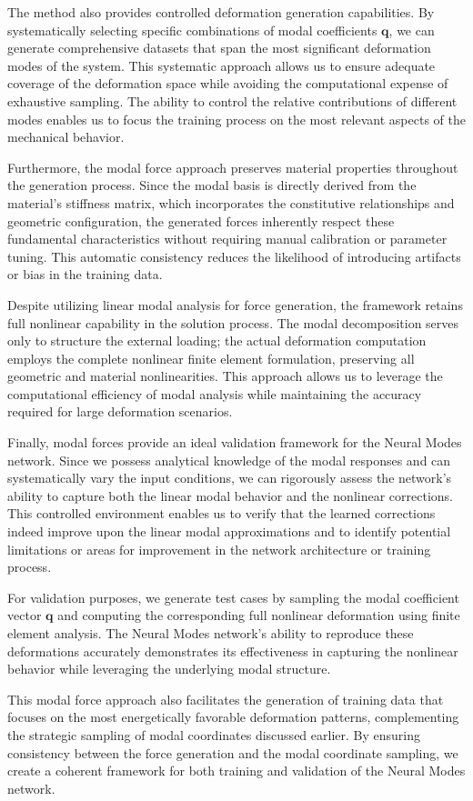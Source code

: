 The method also provides controlled deformation generation capabilities. By systematically selecting specific combinations of modal coefficients $\bm{q}$, we can generate comprehensive datasets that span the most significant deformation modes of the system. This systematic approach allows us to ensure adequate coverage of the deformation space while avoiding the computational expense of exhaustive sampling. The ability to control the relative contributions of different modes enables us to focus the training process on the most relevant aspects of the mechanical behavior.

Furthermore, the modal force approach preserves material properties throughout the generation process. Since the modal basis is directly derived from the material's stiffness matrix, which incorporates the constitutive relationships and geometric configuration, the generated forces inherently respect these fundamental characteristics without requiring manual calibration or parameter tuning. This automatic consistency reduces the likelihood of introducing artifacts or bias in the training data.

Despite utilizing linear modal analysis for force generation, the framework retains full nonlinear capability in the solution process. The modal decomposition serves only to structure the external loading; the actual deformation computation employs the complete nonlinear finite element formulation, preserving all geometric and material nonlinearities. This approach allows us to leverage the computational efficiency of modal analysis while maintaining the accuracy required for large deformation scenarios.

Finally, modal forces provide an ideal validation framework for the Neural Modes network. Since we possess analytical knowledge of the modal responses and can systematically vary the input conditions, we can rigorously assess the network's ability to capture both the linear modal behavior and the nonlinear corrections. This controlled environment enables us to verify that the learned corrections indeed improve upon the linear modal approximations and to identify potential limitations or areas for improvement in the network architecture or training process.

For validation purposes, we generate test cases by sampling the modal coefficient vector $\bm{q}$ and computing the corresponding full nonlinear deformation using finite element analysis. The Neural Modes network's ability to reproduce these deformations accurately demonstrates its effectiveness in capturing the nonlinear behavior while leveraging the underlying modal structure.

This modal force approach also facilitates the generation of training data that focuses on the most energetically favorable deformation patterns, complementing the strategic sampling of modal coordinates discussed earlier. By ensuring consistency between the force generation and the modal coordinate sampling, we create a coherent framework for both training and validation of the Neural Modes network.

